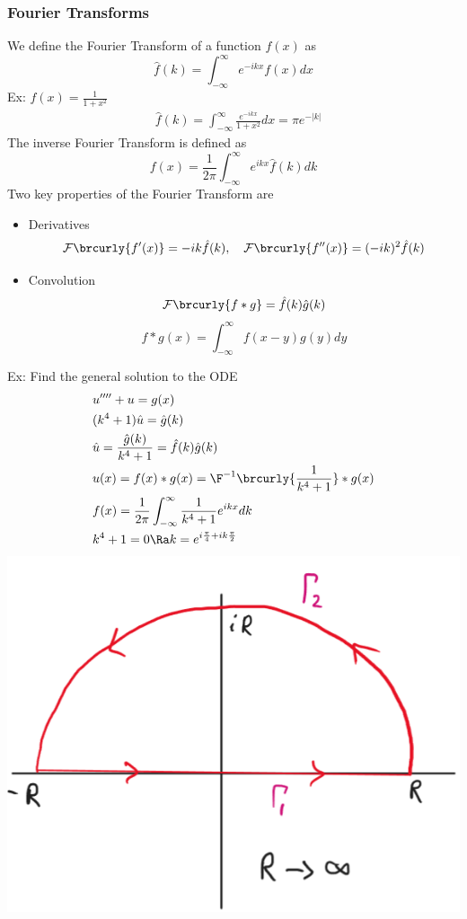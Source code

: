 \subsubsection{Fourier Transforms}
We define the Fourier Transform of a function $f(x)$ as
\[\hat{f}(k)=\int_{-\infty}^\infty e^{-ikx}f(x)dx\]
Ex: $f(x)=\frac{1}{1+x^2}$
\begin{align*}
    &\hat{f}(k)=\int_{-\infty}^\infty\frac{e^{-ikx}}{1+x^2}dx=\pi e^{-|k|}
\end{align*}
The inverse Fourier Transform is defined as
\[f(x)=\frac{1}{2\pi}\int_{-\infty}^\infty e^{ikx}\hat{f}(k)dk\]
Two key properties of the Fourier Transform are
\begin{itemize}
    \item Derivatives
    \[\mathcal{F}\brcurly{f'(x)}=-ik\hat{f}(k),\quad \mathcal{F}\brcurly{f''(x)}=(-ik)^2\hat{f}(k)\]
    \item Convolution
    \[\mathcal{F}\brcurly{f * g}=\hat{f}(k)\hat{g}(k)\]
    \[f * g(x)=\int_{-\infty}^\infty f(x-y)g(y)dy\]
\end{itemize}
Ex: Find the general solution to the ODE
\begin{align*}
    &u''''+u=g(x)\\
    &(k^4+1)\hat{u}=\hat{g}(k)\\
    &\hat{u}=\frac{\hat{g}(k)}{k^4+1}=\hat{f}(k)\hat{g}(k)\\
    &u(x)=f(x)*g(x)=\F^{-1}\brcurly{\frac{1}{k^4+1}}*g(x)\\
    &f(x)=\frac{1}{2\pi}\int_{-\infty}^\infty\frac{1}{k^4+1}e^{ikx}dk\\
    &k^4+1=0\Ra k=e^{i\frac{\pi}{4}+ik\frac{\pi}{2}}
\end{align*}
\includegraphics[scale=0.6]{Images/ComplexAnalysisPictures/HalfMoon.png}
